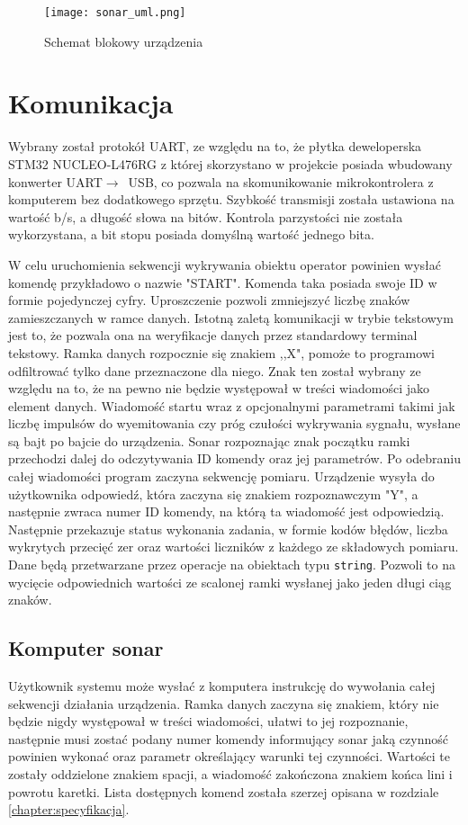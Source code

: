 \begin{figure}[ht!]
    \centering
    \texttt{[image: sonar\_uml.png]}
    \caption{Schemat blokowy urządzenia}
    \label{fig:uml}
\end{figure}


\section{Komunikacja}

Wybrany został protokół UART, ze względu na to, że płytka deweloperska STM32 NUCLEO-L476RG 
z której skorzystano w projekcie posiada wbudowany konwerter UART$\rightarrow$~USB, 
co pozwala na skomunikowanie mikrokontrolera z komputerem bez dodatkowego sprzętu.
Szybkość transmisji została ustawiona na wartość \unit[115200]{b/s}, a długość słowa na \unit[8]{bitów}. 
Kontrola parzystości nie została wykorzystana, a bit stopu posiada domyślną wartość jednego bita.

W celu uruchomienia sekwencji wykrywania obiektu operator powinien wysłać komendę przykładowo o nazwie "START". 
Komenda taka posiada swoje ID w formie pojedynczej cyfry. Uproszczenie pozwoli zmniejszyć liczbę znaków zamieszczanych w ramce danych. 
Istotną zaletą komunikacji w trybie tekstowym jest to, że pozwala ona na weryfikacje danych przez standardowy terminal tekstowy. 
Ramka danych rozpocznie się znakiem ,,X", pomoże to programowi odfiltrować tylko dane przeznaczone dla niego. Znak ten został wybrany ze względu na to, 
że na pewno nie będzie występował w treści wiadomości jako element danych.
Wiadomość startu wraz z opcjonalnymi parametrami takimi jak liczbę impulsów do wyemitowania czy próg czułości wykrywania sygnału, wysłane są bajt po bajcie do urządzenia. 
Sonar rozpoznając znak początku ramki przechodzi dalej do odczytywania ID komendy oraz jej parametrów. Po odebraniu całej wiadomości program zaczyna sekwencję pomiaru.
Urządzenie wysyła do użytkownika odpowiedź, która zaczyna się znakiem rozpoznawczym "Y", a następnie zwraca numer ID komendy, na którą ta wiadomość jest odpowiedzią.
Następnie przekazuje status wykonania zadania, w formie kodów błędów, liczba wykrytych przecięć zer oraz wartości liczników z każdego ze składowych pomiaru.
Dane będą przetwarzane przez operacje na obiektach typu {\tt string}. Pozwoli to na wycięcie odpowiednich wartości ze scalonej ramki wysłanej jako jeden długi ciąg znaków.

\subsection{Komputer \textrightarrow{} sonar}
Użytkownik systemu może wysłać z komputera instrukcję do wywołania całej sekwencji działania urządzenia. 
Ramka danych zaczyna się znakiem, który nie będzie nigdy występował w treści wiadomości, ułatwi to jej rozpoznanie, 
następnie musi zostać podany numer komendy informujący sonar jaką czynność powinien wykonać oraz 
parametr określający warunki tej czynności. Wartości te zostały oddzielone znakiem spacji, a wiadomość zakończona znakiem końca lini i powrotu karetki.
Lista dostępnych komend została szerzej opisana w rozdziale \ref{chapter:specyfikacja}. 

